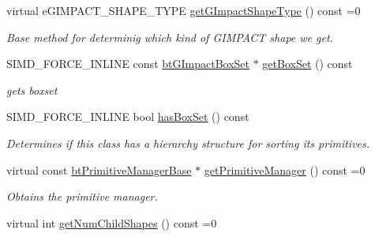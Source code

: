 \begin{Indent}{\bf }\par
\begin{CompactItemize}
\item 
virtual eGIMPACT\_\-SHAPE\_\-TYPE \hyperlink{classbt_g_impact_shape_interface_25cacbe448997e3f8ec99cb2d4952859}{getGImpactShapeType} () const =0
\begin{CompactList}\small\item\em Base method for determinig which kind of GIMPACT shape we get. \item\end{CompactList}\item 
\hypertarget{classbt_g_impact_shape_interface_f790f5e01743f08a141b4ee9721cba43}{
SIMD\_\-FORCE\_\-INLINE const \hyperlink{classbt_g_impact_quantized_bvh}{btGImpactBoxSet} $\ast$ \hyperlink{classbt_g_impact_shape_interface_f790f5e01743f08a141b4ee9721cba43}{getBoxSet} () const }
\label{classbt_g_impact_shape_interface_f790f5e01743f08a141b4ee9721cba43}

\begin{CompactList}\small\item\em gets boxset \item\end{CompactList}\item 
\hypertarget{classbt_g_impact_shape_interface_042a632b8e87f0fe3c2294b9ab8457c6}{
SIMD\_\-FORCE\_\-INLINE bool \hyperlink{classbt_g_impact_shape_interface_042a632b8e87f0fe3c2294b9ab8457c6}{hasBoxSet} () const }
\label{classbt_g_impact_shape_interface_042a632b8e87f0fe3c2294b9ab8457c6}

\begin{CompactList}\small\item\em Determines if this class has a hierarchy structure for sorting its primitives. \item\end{CompactList}\item 
\hypertarget{classbt_g_impact_shape_interface_291328e80a5f22cffc50924ebb90040a}{
virtual const \hyperlink{classbt_primitive_manager_base}{btPrimitiveManagerBase} $\ast$ \hyperlink{classbt_g_impact_shape_interface_291328e80a5f22cffc50924ebb90040a}{getPrimitiveManager} () const =0}
\label{classbt_g_impact_shape_interface_291328e80a5f22cffc50924ebb90040a}

\begin{CompactList}\small\item\em Obtains the primitive manager. \item\end{CompactList}\item 
\hypertarget{classbt_g_impact_shape_interface_a145ed4669ce202e97d1a9e1081b3560}{
virtual int \hyperlink{classbt_g_impact_shape_interface_a145ed4669ce202e97d1a9e1081b3560}{getNumChildShapes} () const =0}
\label{classbt_g_impact_shape_interface_a145ed4669ce202e97d1a9e1081b3560}


\end{CompactItemize}
\end{Indent}
